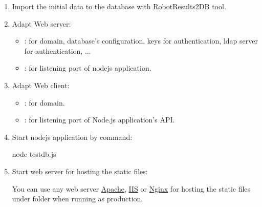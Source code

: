 \begin{enumerate}
\begin{itemize}
\begin{itemize}
\item create all store procedures by loading all SQL scripts under 
       folder then execute them.

\begin{boxhint}{Notice}
If you have created your schema with other name than the default 
name \emph{pjcmd\_bvt}, you should replace the schema name before executing SQL 
scripts.
\end{boxhint}

\end{itemize}

\end{itemize}

\item Import the initial data to the database with \href{https://github.com/test-fullautomation/robotframework-testresultwebapptool}{RobotResults2DB tool}.

\item Adapt Web server:
\begin{itemize}
   \item {}: for domain, database's configuration,
         keys for authentication, ldap server for authentication, ...
   \item {}: for listening port of nodejs application.
\end{itemize}

\item Adapt Web client:
\begin{itemize}
   \item {}: for domain.
   \item {}: for 
         listening port of Node.js application's API.
\end{itemize}

\item Start nodejs application by command:
\begin{robotlog}
node testdb.js
\end{robotlog}

\item Start web server for hosting the static files:

You can use any web server \href{https://httpd.apache.org/}{Apache}, 
\href{https://www.iis.net/}{IIS} or \href{https://www.nginx.com/}{Nginx} for 
hosting the static files under  folder when running 
as production.


\end{enumerate}
